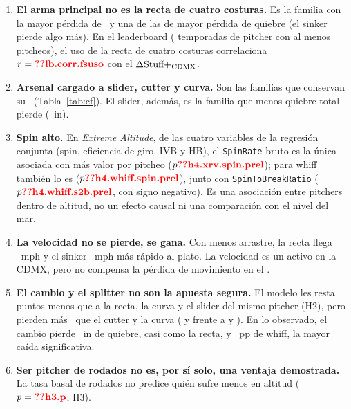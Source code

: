 \documentclass[10pt]{article}
\begin{document}
\begin{enumerate}
  \item \textbf{El arma principal no es la recta de cuatro costuras.} Es la familia con la mayor pérdida de \splus\ y una de las de mayor pérdida de quiebre (el sinker pierde algo más). En el leaderboard ( temporadas de pitcher con al menos  pitcheos), el uso de la recta de cuatro costuras correlaciona $r=\cf{lb.corr.fsuso}$ con el $\Delta\text{Stuff+}_{\text{CDMX}}$.
  \item \textbf{Arsenal cargado a slider, cutter y curva.} Son las familias que conservan su \splus\ (Tabla~\ref{tab:cf}). El slider, además, es la familia que menos quiebre total pierde (~in).
  \item \textbf{Spin alto.} En \emph{Extreme Altitude}, de las cuatro variables de la regresión conjunta (spin, eficiencia de giro, IVB y HB), el \texttt{SpinRate} bruto es la única asociada con más valor por pitcheo ($p\cf{h4.xrv.spin.prel}$); para whiff también lo es ($p\cf{h4.whiff.spin.prel}$), junto con \texttt{SpinToBreakRatio} ($p\cf{h4.whiff.s2b.prel}$, con signo negativo). Es una asociación entre pitchers dentro de altitud, no un efecto causal ni una comparación con el nivel del mar.
  \item \textbf{La velocidad no se pierde, se gana.} Con menos arrastre, la recta llega ~mph y el sinker ~mph más rápido al plato. La velocidad es un activo en la CDMX, pero no compensa la pérdida de movimiento en el \splus.
  \item \textbf{El cambio y el splitter no son la apuesta segura.} El modelo les resta  puntos menos que a la recta, la curva y el slider del mismo pitcher (H2), pero pierden más \splus\ que el cutter y la curva ( y  frente a  y ). En lo observado, el cambio pierde ~in de quiebre, casi como la recta, y ~pp de whiff, la mayor caída significativa.
  \item \textbf{Ser pitcher de rodados no es, por sí solo, una ventaja demostrada.} La tasa basal de rodados no predice quién sufre menos en altitud ($p=\cf{h3.p}$, H3).
\end{enumerate}

\begin{table}[H]\centering\small
\caption{Qué gana y qué pierde \splus\ en la CDMX por familia (contrafactual del modelo; media ponderada por pitcheos en toda la LMB).}\label{tab:cf}
\end{table}
\end{document}
